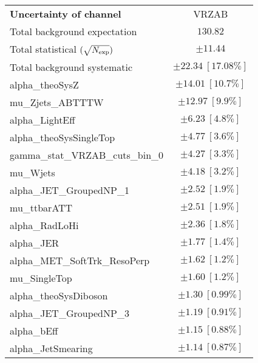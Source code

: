 
\begin{table}
\begin{center}
\setlength{\tabcolsep}{0.0pc}
\begin{tabular*}{\textwidth}{@{\extracolsep{\fill}}lc}
\noalign{\smallskip}\hline\noalign{\smallskip}
{\bf Uncertainty of channel}                                    & VRZAB            \\
\noalign{\smallskip}\hline\noalign{\smallskip}
Total background expectation             &  $130.82$       \\
\noalign{\smallskip}\hline\noalign{\smallskip}
Total statistical $(\sqrt{N_{\rm exp}})$              & $\pm 11.44$       \\
Total background systematic               & $\pm 22.34\ [17.08\%] $             \\
\noalign{\smallskip}\hline\noalign{\smallskip}
\noalign{\smallskip}\hline\noalign{\smallskip}
alpha\_theoSysZ         & $\pm 14.01\ [10.7\%] $       \\
mu\_Zjets\_ABTTTW         & $\pm 12.97\ [9.9\%] $       \\
alpha\_LightEff         & $\pm 6.23\ [4.8\%] $       \\
alpha\_theoSysSingleTop         & $\pm 4.77\ [3.6\%] $       \\
gamma\_stat\_VRZAB\_cuts\_bin\_0         & $\pm 4.27\ [3.3\%] $       \\
mu\_Wjets         & $\pm 4.18\ [3.2\%] $       \\
alpha\_JET\_GroupedNP\_1         & $\pm 2.52\ [1.9\%] $       \\
mu\_ttbarATT         & $\pm 2.51\ [1.9\%] $       \\
alpha\_RadLoHi         & $\pm 2.36\ [1.8\%] $       \\
alpha\_JER         & $\pm 1.77\ [1.4\%] $       \\
alpha\_MET\_SoftTrk\_ResoPerp         & $\pm 1.62\ [1.2\%] $       \\
mu\_SingleTop         & $\pm 1.60\ [1.2\%] $       \\
alpha\_theoSysDiboson         & $\pm 1.30\ [0.99\%] $       \\
alpha\_JET\_GroupedNP\_3         & $\pm 1.19\ [0.91\%] $       \\
alpha\_bEff         & $\pm 1.15\ [0.88\%] $       \\
alpha\_JetSmearing         & $\pm 1.14\ [0.87\%] $       \\

\end{tabular*}
\end{center}
\end{table}
